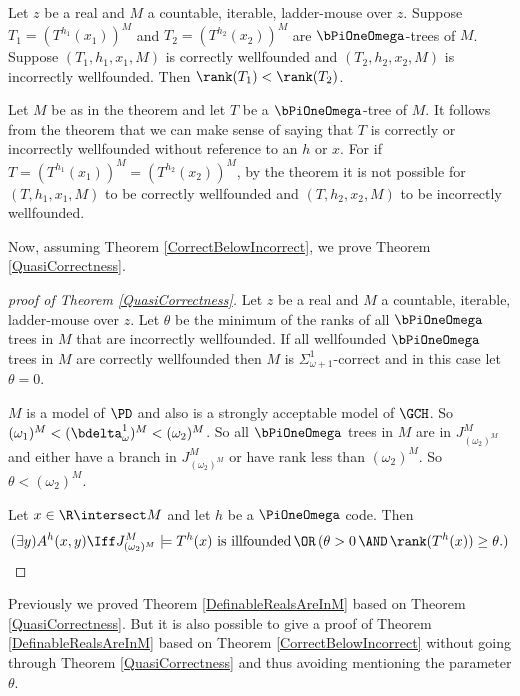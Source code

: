 \documentclass[oneside,12pt]{amsart}
\begin{document}
\begin{theorem}
\label{CorrectBelowIncorrect}
Let $z$ be a real and $M$ a countable, iterable, ladder-mouse over $z$.
Suppose $T_1 = (T^{h_1}(x_1))^M$ and $T_2 = (T^{h_2}(x_2))^M$ are 
$\bPiOneOmega$-trees of $M$. Suppose $(T_1,h_1,x_1,M)$ is correctly
wellfounded and $(T_2,h_2,x_2,M)$ is incorrectly wellfounded. 
Then $\rank(T_1) < \rank(T_2)$.
\end{theorem}

\begin{remark}
\label{pure-correctly-wellfounded}
Let $M$ be as in the theorem and let $T$ be a $\bPiOneOmega$-tree of $M$.
It follows from the theorem that we can make sense of saying that
$T$ is correctly or incorrectly wellfounded without reference to an $h$ or $x$.
For if $T=(T^{h_1}(x_1))^M = (T^{h_2}(x_2))^M$, by the theorem it is not possible
for $(T,h_1,x_1,M)$ to be correctly wellfounded and $(T,h_2,x_2,M)$ to be
incorrectly wellfounded.
\end{remark}

Now, assuming Theorem \ref{CorrectBelowIncorrect}, we prove Theorem
\ref{QuasiCorrectness}.

\begin{proof}[proof of Theorem \ref{QuasiCorrectness}]
Let $z$ be a real and $M$ a countable, iterable, ladder-mouse over $z$.
Let $\theta$ be the minimum of the ranks of all
$\bPiOneOmega$ trees in $M$ that are  incorrectly wellfounded.
If all wellfounded $\bPiOneOmega$ trees in $M$ are correctly wellfounded
then $M$ is $\Sigma^1_{\omega+1}$-correct and in this case let $\theta=0$.

$M$ is a model of $\PD$ and also is a strongly acceptable model of $\GCH$.
So $(\omega_1)^M<(\bdelta^1_{\omega})^M < (\omega_2)^M$.
So all $\bPiOneOmega$ trees in $M$ are in $J^M_{(\omega_2)^M}$ and either have a branch
in $J^M_{(\omega_2)^M}$ or have rank less than $(\omega_2)^M$.
So $\theta < (\omega_2)^M$.


Let $x\in\R\intersect M$ and let $h$ be a
$\PiOneOmega$ code. Then
$$(\exists y) A^h(x,y) \Iff J^M_{(\omega_2)^M}\models T^h(x) \text{ is illfounded} \,\OR\, (\theta>0 \,\AND\, \rank(T^h(x)) \geq \theta.)$$
\end{proof}

Previously we proved Theorem \ref{DefinableRealsAreInM} based on
Theorem \ref{QuasiCorrectness}. But it is also possible to give a proof
of Theorem \ref{DefinableRealsAreInM} based on Theorem \ref{CorrectBelowIncorrect}
without going through Theorem \ref{QuasiCorrectness} and thus avoiding
mentioning the parameter $\theta$.
\end{document}

